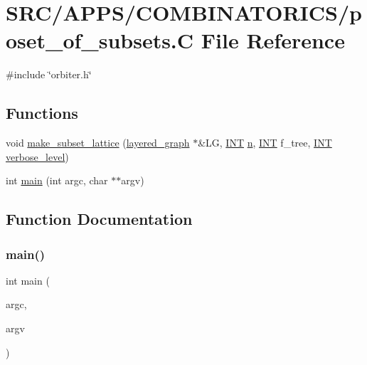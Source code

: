 \hypertarget{poset__of__subsets_8_c}{}\section{S\+R\+C/\+A\+P\+P\+S/\+C\+O\+M\+B\+I\+N\+A\+T\+O\+R\+I\+C\+S/poset\+\_\+of\+\_\+subsets.C File Reference}
\label{poset__of__subsets_8_c}
{\ttfamily \#include \char`\"{}orbiter.\+h\char`\"{}}\newline
\subsection*{Functions}
\begin{DoxyCompactItemize}
\item 
void \mbox{\hyperlink{poset__of__subsets_8_c_a1461006fc0ae155dcbb22a4ad0ae712e}{make\+\_\+subset\+\_\+lattice}} (\mbox{\hyperlink{classlayered__graph}{layered\+\_\+graph}} $\ast$\&LG, \mbox{\hyperlink{galois_8h_a09fddde158a3a20bd2dcadb609de11dc}{I\+NT}} \mbox{\hyperlink{simeon_8_c_a7f2cd26777ce0ff3fdaf8d02aacbddfb}{n}}, \mbox{\hyperlink{galois_8h_a09fddde158a3a20bd2dcadb609de11dc}{I\+NT}} f\+\_\+tree, \mbox{\hyperlink{galois_8h_a09fddde158a3a20bd2dcadb609de11dc}{I\+NT}} \mbox{\hyperlink{simeon_8_c_a818073fbcc2f439e7c56952f67386122}{verbose\+\_\+level}})
\item 
int \mbox{\hyperlink{poset__of__subsets_8_c_a3c04138a5bfe5d72780bb7e82a18e627}{main}} (int argc, char $\ast$$\ast$argv)
\end{DoxyCompactItemize}


\subsection{Function Documentation}
\mbox{\label{poset__of__subsets_8_c_a3c04138a5bfe5d72780bb7e82a18e627}} 
\subsubsection{\texorpdfstring{main()}{main()}}
{\footnotesize\ttfamily int main (\begin{DoxyParamCaption}\item[{int}]{argc,  }\item[{char $\ast$$\ast$}]{argv }\end{DoxyParamCaption})}

